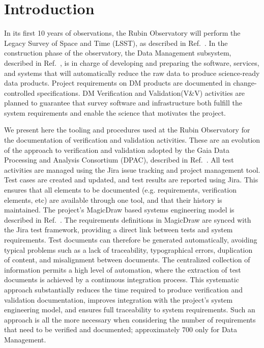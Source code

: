 \section{Introduction}

In its first 10 years of observations, the Rubin Observatory will perform the Legacy Survey of Space and Time (LSST), as described
in Ref.~. In the construction phase of the observatory, the Data Management subsystem,
described in Ref.~, is in charge of developing and preparing the
software, services, and systems that will automatically reduce the raw data to produce science-ready data products.
Project requirements on DM products are documented in change-controlled specifications. DM Verification and Validation(V\&V)
activities are planned to guarantee that survey software and infrastructure both fulfill the system requirements
and enable the science that motivates the project.

We present here the tooling and procedures used at the Rubin Observatory for the documentation of verification and validation activities.
These are an evolution of the approach to verification and validation adopted by the Gaia Data Processing and Analysis Consortium (DPAC), described in Ref.~.
All test activities are managed using the Jira issue tracking and project management tool. 
Test cases are created and updated, and test results are reported using Jira. 
This ensures that all elements to be documented (e.g. requirements, verification elements, etc) 
are available through one tool, and that their history is maintained.
The project's MagicDraw based systems engineering model is described in Ref.~. 
The requirements definitions in MagicDraw are synced with the Jira test framework, providing a direct link between tests and system requirements.
Test documents can therefore be generated automatically, avoiding typical problems such as a lack of traceability, typographical errors, duplication of content, and misalignment between documents. 
The centralized collection of information permits a high level of automation, where the extraction of test documents is
achieved by a continuous integration process. 
This systematic approach substantially reduces the time required to produce verification and validation documentation, improves integration with the project's system engineering model, and ensures full traceability to system requirements.
Such an approach is all the more necessary when considering the number of requirements that need to be verified and documented; approximately 700 only for Data Management.

